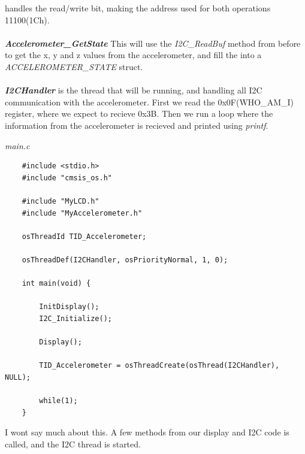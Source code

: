 \documentclass{article}
\begin{document}
handles the read/write bit, making the address used for both operations 11100(1Ch).\\
\\
\textbf{\textit{Accelerometer\_GetState}} This will use the \textit{I2C\_ReadBuf} method 
from before to get the x, y and z values from the accelerometer, and fill the into 
a \textit{ACCELEROMETER\_STATE} struct.\\
\\
\textbf{\textit{I2CHandler}} is the thread that will be running, and handling all 
I2C communication with the accelerometer. First we read the 0x0F(WHO\_AM\_I) register, 
where we expect to recieve 0x3B. Then we run a loop where the information from the 
accelerometer is recieved and printed using \textit{printf}.

\vspace{4mm}
\textit{main.c}
\begin{lstlisting}
    #include <stdio.h>
    #include "cmsis_os.h"

    #include "MyLCD.h"
    #include "MyAccelerometer.h"

    osThreadId TID_Accelerometer;

    osThreadDef(I2CHandler, osPriorityNormal, 1, 0);

    int main(void) {
        
        InitDisplay();
        I2C_Initialize();
        
        Display();
        
        TID_Accelerometer = osThreadCreate(osThread(I2CHandler), NULL);
        
        while(1);
    }
\end{lstlisting}
I wont say much about this. A few methods from our display and I2C code is called, 
and the I2C thread is started.

\vspace{2mm}
\end{document}
